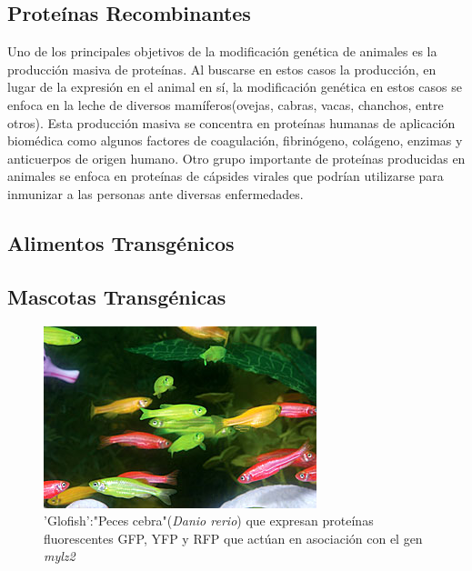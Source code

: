 \documentclass[fleqn,10pt]{SelfArx} %
\begin{document}
\subsection{Proteínas Recombinantes}

Uno de los principales objetivos de la modificación genética de animales es la producción masiva de proteínas. Al buscarse en estos casos la producción, en lugar de la expresión en el animal en sí, la modificación genética en estos casos se enfoca en la leche de diversos mamíferos(ovejas, cabras, vacas, chanchos, entre otros).  Esta producción masiva se concentra en proteínas humanas de aplicación biomédica como algunos factores de coagulación, fibrinógeno, colágeno, enzimas y anticuerpos de origen humano\cite{Koszarycz2004, niemann2007transgenic, houdebine2009production}. Otro grupo importante de proteínas producidas en animales se enfoca en proteínas de cápsides virales que podrían utilizarse para inmunizar a las personas ante diversas enfermedades\cite{Durocher15012002}.



\subsection{Alimentos Transgénicos}
  


\subsection{Mascotas Transgénicas}
    
  \begin{figure}[ht]\centering
\includegraphics[width=\linewidth]{images/danio}
\caption{'Glofish':"Peces cebra"(\textit{Danio rerio}) que expresan proteínas fluorescentes GFP, YFP y RFP que actúan en asociación con el gen \textit{mylz2} \cite{gong2003development}}
\end{figure}
\end{document}
